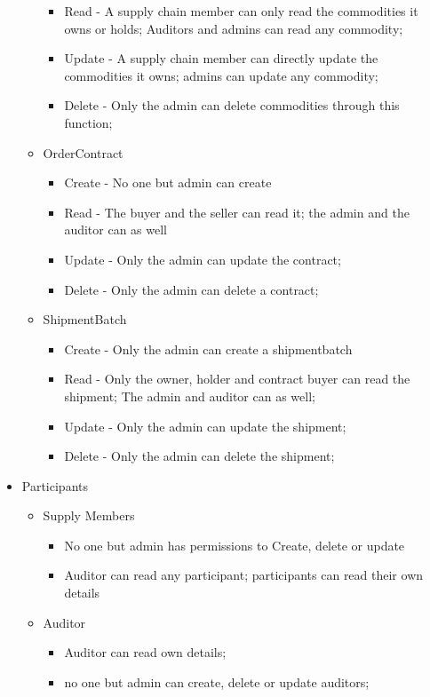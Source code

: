\begin{itemize}
\begin{itemize}
\begin{itemize}
			\item Read - A supply chain member can only read the commodities it owns or holds; Auditors and admins can read any commodity;
			\item Update - A supply chain member can directly update the commodities it owns; admins can update any commodity;
            \item Delete - Only the admin can delete commodities through this function;
            \end{itemize}
        \item OrderContract
            \begin{itemize}
			\item Create - No one but admin can create
			\item Read - The buyer and the seller can read it; the admin and the auditor can as well
			\item Update - Only the admin can update the contract;
            \item Delete - Only the admin can delete a contract;
            \end{itemize}
        \item ShipmentBatch
            \begin{itemize}
			\item Create - Only the admin can create a shipmentbatch
			\item Read - Only the owner, holder and contract buyer can read the shipment; The admin and auditor can as well;
			\item Update - Only the admin can update the shipment;
            \item Delete - Only the admin can delete the shipment;
            \end{itemize}
        \end{itemize}
    \item Participants
        \begin{itemize}
        \item Supply Members
            \begin{itemize}
			\item No one but admin has permissions to Create, delete or update
            \item Auditor can read any participant; participants can read their own details
            \end{itemize}
        \item Auditor
            \begin{itemize}
			\item Auditor can read own details; 
            \item no one but admin can create, delete or update auditors;
            \end{itemize}
        \end{itemize}
\end{itemize}	

